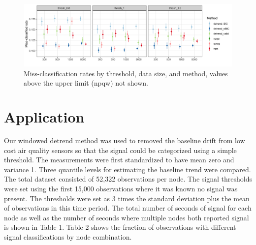 \documentclass[12pt]{article}
\begin{document}
	\begin{figure}[h!]
		\caption{Miss-classification rates by threshold, data size, and method, values above the upper limit (npqw) not shown.}
		\includegraphics[width = \linewidth]{Figures/peaks_missclass.png}
	\end{figure}
	
	 
	
	\FloatBarrier
	
	\section{Application}
	
	
	Our windowed detrend method was used to removed the baseline drift from low cost air quality sensors so that the signal could be categorized using a simple threshold. The measurements were first standardized to have mean zero and variance 1. Three quantile levels for estimating the baseline trend were compared. The total dataset consisted of 52,322 observations per node. 
	The signal thresholds were set using the first 15,000 observations where it was known no signal was present. The thresholds were set as 3 times the standard deviation plus the mean of observations in this time period. The total number of seconds of signal for each node as well as the number of seconds where multiple nodes both reported signal is shown in Table 1. Table 2 shows the fraction of observations with different signal classifications by node combination. 
	
\end{document}
